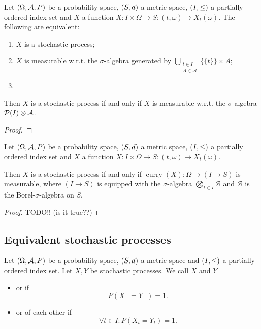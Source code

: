 \begin{lemma}
Let $\left( \Omega, \mathcal{A}, P \right)$ be a probability space, $\left( S,d \right)$ a metric space, $\left( I,\leq \right)$ a partially ordered index set and $X$ a function $X: I\times \Omega\to S: (t,\omega) \mapsto X_t(\omega)$. The following are equivalent:
\begin{enumerate}
\item $X$ is a stochastic process;
\item $X$ is measurable w.r.t. the $\sigma$-algebra generated by $\bigcup_{\substack{t\in I\\ A\in \mathcal{A}}}\{\{t\}\}\times A$;
\item 
\end{enumerate}

Then $X$ is a stochastic process \textup{if and only if} $X$ is measurable w.r.t. the $\sigma$-algebra $\operatorname{\mathcal{P}}(I)\otimes \mathcal{A}$.
\end{lemma}
\begin{proof}

\end{proof}

\begin{lemma}
Let $\left( \Omega, \mathcal{A}, P \right)$ be a probability space, $\left( S,d \right)$ a metric space, $\left( I,\leq \right)$ a partially ordered index set and $X$ a function $X: I\times \Omega\to S: (t,\omega) \mapsto X_t(\omega)$.

Then $X$ is a stochastic process \textup{if and only if} $\operatorname{curry}(X): \Omega \to (I\to S)$ is measurable, where $(I\to S)$ is equipped with the $\sigma$-algebra $\bigotimes_{t\in I}\mathcal{B}$ and $\mathcal{B}$ is the Borel-$\sigma$-algebra on $S$.
\end{lemma}
\begin{proof}
TODO!! (is it true??)
\end{proof}

\subsection{Equivalent stochastic processes}
\begin{definition}
Let $\left( \Omega, \mathcal{A}, P \right)$ be a probability space, $\left( S,d \right)$ a metric space and $\left( I,\leq \right)$ a partially ordered index set. Let $X,Y$ be stochastic processes. We call $X$ and $Y$
\begin{itemize}
\item {} or  if
\[ P(X_- = Y_-) = 1. \]
\item {} or  of each other if
\[ \forall t\in I: P(X_t = Y_t) = 1.  \]
\end{itemize}
\end{definition}

